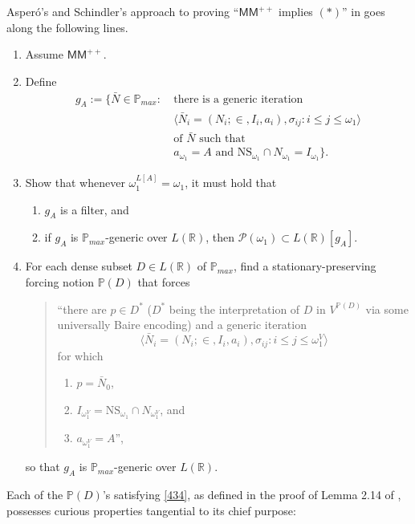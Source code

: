 \documentclass[12pt]{article}
\numberwithin{equation}{section}
\begin{document}
Asper\'{o}'s and Schindler's approach to proving ``$\mathsf{MM}^{++}$ implies $(*)$'' in \cite{schindler} goes along the following lines. 
\begin{enumerate}[label=(\arabic*)]
    \item Assume $\mathsf{MM}^{++}$.
    \item Define 
    \begin{align*}
        g_A := \{\bar{N} \in \mathbb{P}_{max} : \ & \text{there is a generic iteration } \\ 
        & \langle \bar{N}_i = (N_i; \in, I_i, a_i), \sigma_{ij} : i \leq j \leq \omega_1 \rangle \\
        & \text{of } \bar{N} \text{ such that} \\
        & a_{\omega_1} = A \text{ and } \mathrm{NS}_{\omega_1} \cap N_{\omega_1} = I_{\omega_1}\} \text{.}
    \end{align*}
    \item Show that whenever $\omega_1^{L[A]} = \omega_1$, it must hold that
    \begin{enumerate}[label=(\alph*)]
        \item $g_A$ is a filter, and
        \item if $g_A$ is $\mathbb{P}_{max}$-generic over $L(\mathbb{R})$, then $\mathcal{P}(\omega_1) \subset L(\mathbb{R})[g_A]$.
    \end{enumerate}
    \item\label{434} For each dense subset $D \in L(\mathbb{R})$ of $\mathbb{P}_{max}$, find a stationary-preserving forcing notion $\mathbb{P}(D)$ that forces
    \begin{quote}
        ``there are $p \in D^*$ ($D^*$ being the interpretation of $D$ in $V^{\mathbb{P}(D)}$ via some universally Baire encoding) and a generic iteration $$\langle \bar{N}_i = (N_i; \in, I_i, a_i), \sigma_{ij} : i \leq j \leq \omega_1^V \rangle$$ for which
        \begin{enumerate}[label=(\alph*)]
            \item $p = \bar{N}_0$,
            \item $I_{\omega_1^V} = \mathrm{NS}_{\omega_1} \cap N_{\omega_1^V}$, and
            \item $a_{\omega_1^V} = A$'',
        \end{enumerate}
    \end{quote}
    so that $g_A$ is $\mathbb{P}_{max}$-generic over $L(\mathbb{R})$.
\end{enumerate}
Each of the $\mathbb{P}(D)$'s satisfying \ref{434}, as defined in the proof of Lemma 2.14 of \cite{schindler}, possesses curious properties tangential to its chief purpose:
\end{document}
